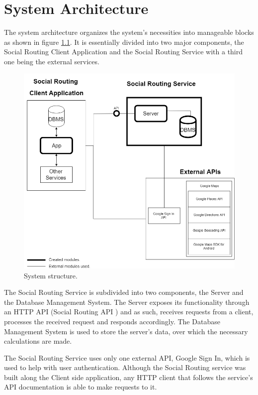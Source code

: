 \chapter{System Architecture}     
        The system architecture organizes the system's necessities into manageable blocks as shown in figure \ref{fig:systemstructure}.
        It is essentially divided into two major components, the Social Routing Client Application \cite{clientapplicationdocs} and the Social Routing Service with a third one being the external services.
        
        \vfill
        \begin{figure}[h]            
            \includegraphics[width=\textwidth]{images/project-structure/system-structure.PNG}
            \caption{System structure.}
            \label{fig:systemstructure}
        \end{figure}  

        The Social Routing Service is subdivided into two components, the Server and the Database Management System. The Server exposes its
        functionality through an HTTP\cite{httponlinedocs} API\cite{api} (Social Routing API \cite{apidocs}) and as such, receives requests from a client, processes the received request and responds accordingly.
        The Database Management System is used to store the server's data, over which the necessary calculations are made.\par The Social 
        Routing Service uses only one external API, Google Sign In\cite{googlesignindocs}, which is used to help with user authentication. Although the Social Routing
        service was built along the Client side application, any HTTP client that follows the service's API documentation is able to make requests
        to it.        

